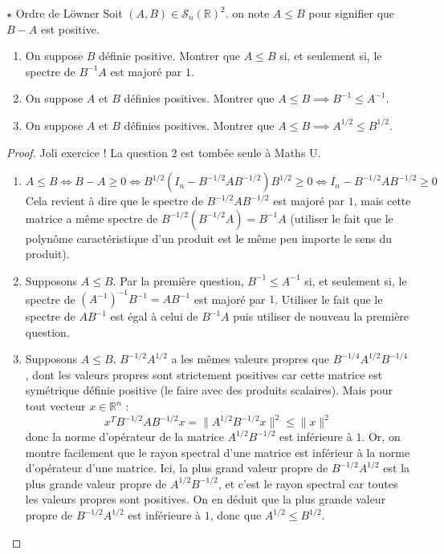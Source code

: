 \documentclass[french,a4paper]{article}
\newcommand{\R}{\mathbb{R}}
\newcommand{\inv}{^{-1}}
\theoremstyle{plain}
\theoremstyle{definition}
\theoremstyle{remark}
\begin{document}
\begin{ex}{$\star$ Ordre de Löwner}
	Soit $(A,B)\in\mathcal{S}_n(\R)^2$. on note $A\leqslant B$ pour signifier que $B-A$ est positive.
	\begin{enumerate}
		\item On suppose $B$ définie positive. Montrer que $A\leqslant B$ si, et seulement si, le spectre de $B\inv A$ est majoré par $1$.
		\item On suppose $A$ et $B$ définies positives. Montrer que $A\leqslant B\implies B\inv\leqslant A\inv$.
		\item On suppose $A$ et $B$ définies positives. Montrer que $A\leqslant B\implies A^{1/2}\leqslant B^{1/2}$.
	\end{enumerate}
\end{ex}
\begin{proof}
	Joli exercice ! La question $2$ est tombée seule à Maths U.
	\begin{enumerate}
		\item $A\leqslant B\iff B-A\geqslant 0\iff B^{1/2}(I_n-B^{-1/2}AB^{-1/2})B^{1/2}\geqslant0\iff I_n-B^{-1/2}AB^{-1/2}\geqslant 0$ Cela revient à dire que le spectre de $B^{-1/2}AB^{-1/2}$ est majoré par $1$, mais cette matrice a même spectre de $B^{-1/2}\left(B^{-1/2}A\right)=B\inv A$ (utiliser le fait que le polynôme caractéristique d'un produit est le même peu importe le sens du produit).
		\item Supposons $A\leqslant B$. Par la première question, $B\inv\leqslant A\inv$ si, et seulement si, le spectre de $(A\inv)\inv B\inv=AB\inv$ est majoré par $1$. Utiliser le fait que le spectre de $AB\inv$ est égal à celui de $B\inv A$ puis utiliser de nouveau la première question.
		\item Supposons $A\leqslant B$. $B^{-1/2}A^{1/2}$ a les mêmes valeurs propres que $B^{-1/4}A^{1/2}B^{-1/4}$, dont les valeurs propres sont strictement positives car cette matrice est symétrique définie positive (le faire avec des produits scalaires). Mais pour tout vecteur $x\in\R^n$ : $$x^TB^{-1/2}AB^{-1/2}x=\lVert A^{1/2}B^{-1/2}x\rVert^2\leqslant \lVert x\rVert^2$$ donc la norme d'opérateur de la matrice $A^{1/2}B^{-1/2}$ est inférieure à $1$. Or, on montre facilement que le rayon spectral d'une matrice est inférieur à la norme d'opérateur d'une matrice. Ici, la plus grand valeur propre de $B^{-1/2}A^{1/2}$ est la plus grande valeur propre de $A^{1/2}B^{-1/2}$, et c'est le rayon spectral car toutes les valeurs propres sont positives. On en déduit que la plus grande valeur propre de $B^{-1/2}A^{1/2}$ est inférieure à $1$, donc que $A^{1/2}\leqslant B^{1/2}$.
	\end{enumerate}
\end{proof}
\end{document}
